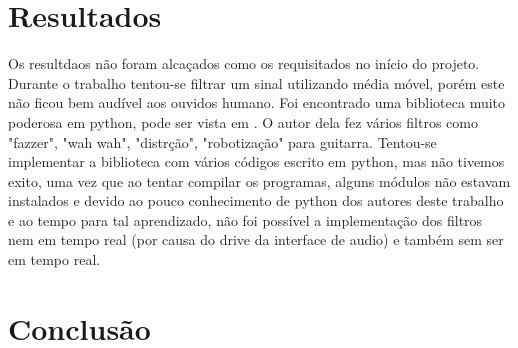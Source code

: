 \documentclass[conference]{IEEEtran}
\begin{document}
\section{Resultados}

Os resultdaos não foram alcaçados como os requisitados no início do projeto. Durante o trabalho tentou-se filtrar um sinal utilizando média móvel, porém este não ficou bem audível aos ouvidos humano.  Foi encontrado uma biblioteca muito poderosa em python, pode ser vista em \cite{audiolazy}. O autor dela fez vários filtros como "fazzer", "wah wah", "distrção", "robotização" para guitarra. Tentou-se implementar a biblioteca com vários códigos escrito em python, mas não tivemos exito, uma vez que ao tentar compilar os programas, alguns módulos não estavam instalados e devido ao pouco conhecimento de python dos autores deste trabalho e ao tempo para tal aprendizado, não foi possível a implementação dos filtros nem em tempo real (por causa do drive da interface de audio) e também sem ser em tempo real.
\section{Conclusão}







\end{document}
